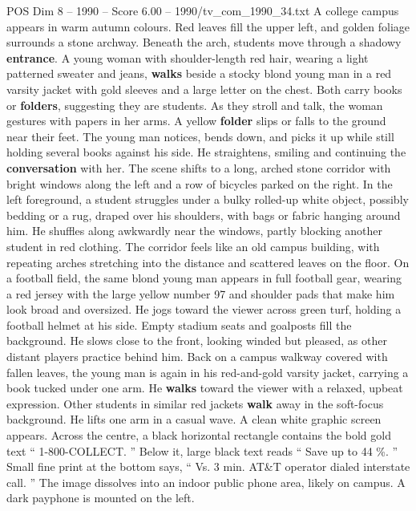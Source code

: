\begin{textsample}{POS Dim 8 – 1990 – Score 6.00 – 1990/tv\_com\_1990\_34.txt}  \label{ex:f8_pos_064}
A college campus appears in warm autumn colours.
Red leaves fill the upper left, and golden foliage surrounds a stone archway.
Beneath the arch, students move through a shadowy \textbf{entrance}.
A young woman with shoulder-length red hair, wearing a light patterned sweater and jeans, \textbf{walks} beside a stocky blond young man in a red varsity jacket with gold sleeves and a large letter on the chest.
Both carry books or \textbf{folders}, suggesting they are students.
As they stroll and talk, the woman gestures with papers in her arms.
A yellow \textbf{folder} slips or falls to the ground near their feet.
The young man notices, bends down, and picks it up while still holding several books against his side.
He straightens, smiling and continuing the \textbf{conversation} with her.
The scene shifts to a long, arched stone corridor with bright windows along the left and a row of bicycles parked on the right.
In the left foreground, a student struggles under a bulky rolled-up white object, possibly bedding or a rug, draped over his shoulders, with bags or fabric hanging around him.
He shuffles along awkwardly near the windows, partly blocking another student in red clothing.
The corridor feels like an old campus building, with repeating arches stretching into the distance and scattered leaves on the floor.
On a football field, the same blond young man appears in full football gear, wearing a red jersey with the large yellow number 97 and shoulder pads that make him look broad and oversized.
He jogs toward the viewer across green turf, holding a football helmet at his side.
Empty stadium seats and goalposts fill the background.
He slows close to the front, looking winded but pleased, as other distant players practice behind him.
Back on a campus walkway covered with fallen leaves, the young man is again in his red-and-gold varsity jacket, carrying a book tucked under one arm.
He \textbf{walks} toward the viewer with a relaxed, upbeat expression.
Other students in similar red jackets \textbf{walk} away in the soft-focus background.
He lifts one arm in a casual wave.
A clean white graphic screen appears.
Across the centre, a black horizontal rectangle contains the bold gold text “ 1-800-COLLECT. ” Below it, large black text reads “ Save up to 44 \%. ” Small fine print at the bottom says, “ Vs. 3 min.
AT\&T operator dialed interstate call. ” The image dissolves into an indoor public phone area, likely on campus.
A dark payphone is mounted on the left.

\end{textsample}
